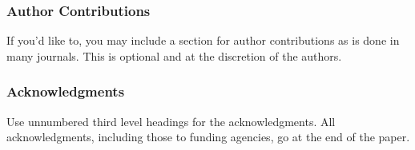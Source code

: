 \documentclass{article} %
\begin{document}
\subsubsection*{Author Contributions}
If you'd like to, you may include  a section for author contributions as is done
in many journals. This is optional and at the discretion of the authors.

\subsubsection*{Acknowledgments}
Use unnumbered third level headings for the acknowledgments. All
acknowledgments, including those to funding agencies, go at the end of the paper.




\end{document}
